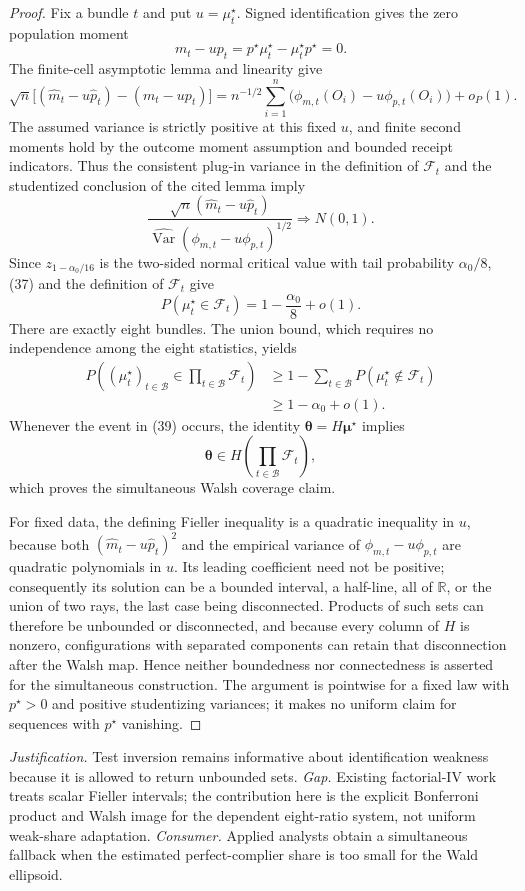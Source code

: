 \documentclass{article}
\begin{document}
\begin{proof}
Fix a bundle \(t\) and put \(u=\mu_t^\star\).  Signed identification gives the zero population moment
\[
m_t-u p_t=p^\star\mu_t^\star-\mu_t^\star p^\star=0. \tag{35}
\]
The finite-cell asymptotic lemma and linearity give
\[
\sqrt n\bigl[(\widehat m_t-u\widehat p_t)-(m_t-u p_t)\bigr]
=n^{-1/2}\sum_{i=1}^n
\bigl(\phi_{m,t}(O_i)-u\phi_{p,t}(O_i)\bigr)+o_P(1). \tag{36}
\]
The assumed variance is strictly positive at this fixed \(u\), and finite second moments hold by the outcome moment assumption and bounded receipt indicators.  Thus the consistent plug-in variance in the definition of \(\mathcal F_t\) and the studentized conclusion of the cited lemma imply
\[
\frac{\sqrt n(\widehat m_t-u\widehat p_t)}
{\widehat{\operatorname{Var}}(\phi_{m,t}-u\phi_{p,t})^{1/2}}
\Rightarrow N(0,1). \tag{37}
\]
Since \(z_{1-\alpha_0/16}\) is the two-sided normal critical value with tail probability \(\alpha_0/8\), (37) and the definition of \(\mathcal F_t\) give
\[
P(\mu_t^\star\in\mathcal F_t)=1-\frac{\alpha_0}{8}+o(1). \tag{38}
\]
There are exactly eight bundles.  The union bound, which requires no independence among the eight statistics, yields
\[
\begin{aligned}
P\left((\mu_t^\star)_{t\in\mathcal B}
 \in\prod_{t\in\mathcal B}\mathcal F_t\right)
&\ge1-\sum_{t\in\mathcal B}P(\mu_t^\star\notin\mathcal F_t)\\
&\ge1-\alpha_0+o(1).
\end{aligned} \tag{39}
\]
Whenever the event in (39) occurs, the identity \(\boldsymbol\theta=H\boldsymbol\mu^\star\) implies
\[
\boldsymbol\theta\in H\left(\prod_{t\in\mathcal B}\mathcal F_t\right),
\]
which proves the simultaneous Walsh coverage claim.

For fixed data, the defining Fieller inequality is a quadratic inequality in \(u\), because both \((\widehat m_t-u\widehat p_t)^2\) and the empirical variance of \(\phi_{m,t}-u\phi_{p,t}\) are quadratic polynomials in \(u\).  Its leading coefficient need not be positive; consequently its solution can be a bounded interval, a half-line, all of \(\mathbb R\), or the union of two rays, the last case being disconnected.  Products of such sets can therefore be unbounded or disconnected, and because every column of \(H\) is nonzero, configurations with separated components can retain that disconnection after the Walsh map.  Hence neither boundedness nor connectedness is asserted for the simultaneous construction.  The argument is pointwise for a fixed law with \(p^\star>0\) and positive studentizing variances; it makes no uniform claim for sequences with \(p^\star\) vanishing.
\end{proof}
\par\smallskip\noindent \textit{Justification.} Test inversion remains informative about identification weakness because it is allowed to return unbounded sets. \textit{Gap.} Existing factorial-IV work treats scalar Fieller intervals; the contribution here is the explicit Bonferroni product and Walsh image for the dependent eight-ratio system, not uniform weak-share adaptation. \textit{Consumer.} Applied analysts obtain a simultaneous fallback when the estimated perfect-complier share is too small for the Wald ellipsoid.
\end{document}
